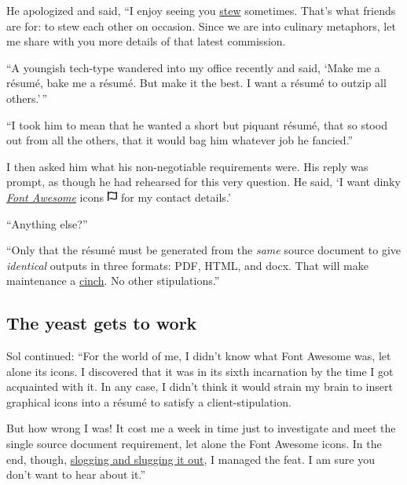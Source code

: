 \documentclass[
  british,
  a4paper,
  rgb,
  dvipsnames,
  svgnames,
  hyphens]{article}
\begin{document}
He apologized and said, ``I enjoy seeing you
\href{https://www.thefreedictionary.com/stew}{stew} sometimes. That's
what friends are for: to stew each other on occasion. Since we are into
culinary metaphors, let me share with you more details of that latest
commission.

``A youngish tech-type wandered into my office recently and said, `Make
me a résumé, bake me a résumé. But make it the best. I want a résumé to
outzip all others.'\,''

``I took him to mean that he wanted a short but piquant résumé, that so
stood out from all the others, that it would bag him whatever job he
fancied.''

I then asked him what his non-negotiable requirements were. His reply
was prompt, as though he had rehearsed for this very question. He said,
`I want dinky \href{https://fontawesome.com/}{\emph{Font Awesome}} icons
\includegraphics[width=0.025\textwidth,height=\textheight]{images/font-awesome.svg}
for my contact details.'

``Anything else?''

``Only that the résumé must be generated from the \emph{same} source
document to give \emph{identical} outputs in three formats: PDF, HTML,
and docx. That will make maintenance a
\href{https://www.merriam-webster.com/dictionary/cinch}{cinch}. No other
stipulations.''

\hypertarget{the-yeast-gets-to-work}{%
\subsection{The yeast gets to work}\label{the-yeast-gets-to-work}}

Sol continued: ``For the world of me, I didn't know what Font Awesome
was, let alone its icons. I discovered that it was in its sixth
incarnation by the time I got acquainted with it. In any case, I didn't
think it would strain my brain to insert graphical icons into a résumé
to satisfy a client-stipulation.

But how wrong I was! It cost me a week in time just to investigate and
meet the single source document requirement, let alone the Font Awesome
icons. In the end, though,
\href{https://idioms.thefreedictionary.com/slog\%2Fslug+it+outslogging}{slogging
and slugging it out}, I managed the feat. I am sure you don't want to
hear about it.''
\end{document}
